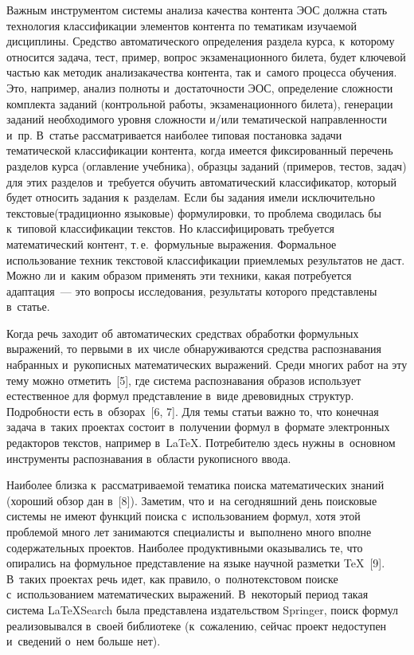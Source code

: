 \begin{multicols}{2}
     Важным инструментом системы анализа качества контента ЭОС 
долж\-на стать технология классификации элементов контента по тематикам 
изуча\-емой дисциплины. Средство автоматического определения раздела 
курса, к~которому относится задача, тест, пример, вопрос экзаменационного 
билета, будет ключевой частью как методик анализа\linebreak качества контента, так 
и~самого процесса обуче\-ния. Это, например, анализ полноты 
и~до\-ста\-точ\-ности ЭОС, определение слож\-ности комплекта заданий 
(контрольной работы, \mbox{экзаменационного} билета), генерации заданий 
необходимого уровня слож\-ности и/или тематической на\-прав\-лен\-ности и~пр. 
В~статье рас\-смат\-ри\-ва\-ет\-ся наиболее типовая по\-ста\-нов\-ка задачи тематической 
классификации контента, когда имеется фиксированный перечень разделов 
кур\-са (оглав\-ле\-ние учебника), образцы заданий (примеров, тес\-тов, задач) для 
этих разделов и~требуется \mbox{обучить} автоматический классификатор, который 
будет относить задания к~разделам. Если бы задания имели исключительно 
текс\-то\-вые\linebreak (традиционно языковые) формулировки, то проб\-ле\-ма сводилась 
бы к~типовой классификации текс\-тов. Но классифицировать требуется 
математический контент, т.\,е.\ формульные выражения. \mbox{Формальное} 
использование техник текс\-то\-вой классификации приемлемых результатов не 
даст. Мож\-но ли и~каким образом применять эти техники, \mbox{какая} потребуется 
адап\-та\-ция~--- это вопросы исследования, результаты которого пред\-став\-ле\-ны в~\mbox{статье}.
     
     Когда речь заходит об автоматических средствах обработки 
формульных выражений, то первыми в~их чис\-ле обнаруживаются средства 
распознавания набранных и~рукописных математических выражений. Среди 
многих работ на эту тему мож\-но отметить~[5], где сис\-те\-ма распознавания 
образов использует естественное для формул пред\-став\-ле\-ние в~виде 
древовидных струк\-тур. По\-дроб\-но\-сти есть в~обзорах~[6, 7]. Для темы статьи 
важ\-но то, что конечная задача в~таких проектах со\-сто\-ит в~получении формул 
в~формате электронных редакторов текс\-тов, например в~\LaTeX. 
Потребителю здесь нуж\-ны в~основном инструменты распознавания в~об\-ласти 
рукописного ввода.
     
     Наиболее близка к~рас\-смат\-ри\-ва\-емой тематика поиска математических 
знаний (хороший обзор дан в~[8]). Заметим, что и~на сегодняшний день 
поисковые сис\-те\-мы не имеют функций поиска с~использованием формул, 
хотя этой проб\-ле\-мой много лет занимаются специалисты и~выполнено много 
впол\-не содержательных проектов. Наиболее продуктивными оказывались те, 
что опирались на формульное пред\-став\-ле\-ние на языке научной раз\-мет\-ки 
\TeX~[9]. В~таких проектах речь идет, как правило, о~пол\-но\-текс\-то\-вом поиске 
с~использованием математических выражений. В~некоторый период такая 
сис\-те\-ма \mbox{LaTeXSearch} была пред\-став\-ле\-на издательством Springer, поиск 
формул реализовывался в~своей биб\-лио\-те\-ке (к~сожалению, сейчас проект 
недоступен и~сведений о~нем больше нет). 
     

\end{multicols}
